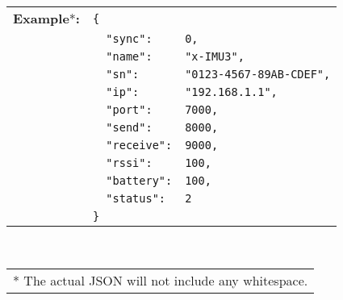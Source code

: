 \begin{table}[H]
    \begin{tabular}{l l l}
        \textbf{Example}*\textbf{:} & \texttt{\{}\\
        & \texttt{~~"sync":} & \texttt{0,}\\
        & \texttt{~~"name":} & \texttt{"x-IMU3",}\\
        & \texttt{~~"sn":} & \texttt{"0123-4567-89AB-CDEF",}\\
        & \texttt{~~"ip":} & \texttt{"192.168.1.1",}\\
        & \texttt{~~"port":} & \texttt{7000,}\\
        & \texttt{~~"send":} & \texttt{8000,}\\
        & \texttt{~~"receive":} & \texttt{9000,}\\
        & \texttt{~~"rssi":} & \texttt{100,}\\
        & \texttt{~~"battery":} & \texttt{100,}\\
        & \texttt{~~"status":} & \texttt{2}\\
        & \texttt{\}}
    \end{tabular}\\
    \begin{tabular}{l}
        \\
        \footnotesize{* The actual \acs{JSON} will not include any whitespace.}
    \end{tabular}
\end{table}
